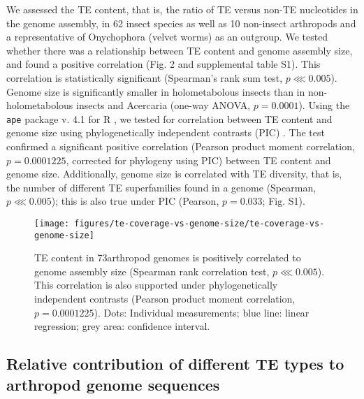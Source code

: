 We assessed the TE content, that is, the ratio of TE versus non-TE
nucleotides in the genome assembly, in 62 insect species as well as 10
non-insect arthropods and a representative of Onychophora (velvet worms)
as an outgroup. We tested whether there was a relationship between TE
content and genome assembly size, and found a positive correlation (Fig.
2 and supplemental table S1). This correlation is statistically
significant (Spearman's rank sum test, \(p \lll 0.005\)). Genome size is
significantly smaller in holometabolous insects than in
non-holometabolous insects and Acercaria (one-way ANOVA,
\(p = 0.0001\)). Using the \texttt{ape} package v. 4.1
\citep{Paradis2004} for R \citep{RCoreTeam2017}, we tested for correlation
between TE content and genome size using phylogenetically independent
contrasts (PIC) \citep{Felsenstein1985}. The test confirmed a significant
positive correlation (Pearson product moment correlation,
\(p = 0.0001225\), corrected for phylogeny using PIC) between TE content
and genome size. Additionally, genome size is correlated with TE
diversity, that is, the number of different TE superfamilies found in a
genome (Spearman, \(p \lll 0.005\)); this is also true under PIC
(Pearson, \(p = 0.033\); Fig. S1).

\begin{figure}[h!]
\begin{center}
\texttt{[image: figures/te-coverage-vs-genome-size/te-coverage-vs-genome-size]}
\caption[TE content is positively correlated to genome size]{{TE content
in 73arthropod genomes is positively correlated to genome assembly size
(Spearman rank correlation test, \(p \lll 0.005\)). This correlation is
also supported under phylogenetically independent contrasts
\protect\citep{Felsenstein1985} (Pearson product moment correlation, \(p
= 0.0001225\)). Dots: Individual measurements; blue line: linear
regression; grey area: confidence interval.%
}}
\end{center}
\end{figure}

\subsection{Relative contribution of different TE types to arthropod
genome
sequences}\label{relative-contribution-of-different-te-types-to-arthropod-genome-sequences}

